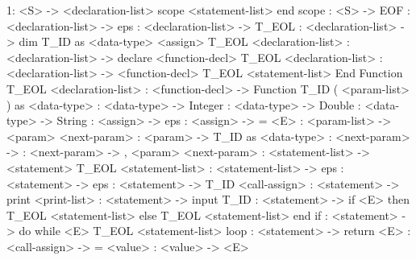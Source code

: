 \documentclass[11pt, titlepage, a4paper]{article}
\begin{document}
		1:  <S> -> <declaration-list> scope <statement-list> end scope :  <S> -> EOF :  <declaration-list> -> eps :  <declaration-list> -> T\_EOL  :  <declaration-list> -> dim T\_ID as <data-type> <assign> T\_EOL <declaration-list> :  <declaration-list> -> declare <function-decl> T\_EOL <declaration-list> :  <declaration-list> -> <function-decl> T\_EOL <statement-list> End Function T\_EOL <declaration-list> :  <function-decl> -> Function T\_ID ( <param-list> ) as <data-type> :  <data-type> -> Integer : <data-type> -> Double : <data-type> -> String : <assign> -> eps : <assign> -> = <E> : <param-list> -> <param> <next-param> : <param> -> T\_ID as <data-type> : <next-param> ->  : <next-param> -> , <param> <next-param> : <statement-list> -> <statement> T\_EOL <statement-list> : <statement-list> -> eps : <statement> -> eps : <statement> -> T\_ID <call-assign> : <statement> -> print <print-list> : <statement> -> input T\_ID : <statement> -> if <E> then T\_EOL <statement-list> else T\_EOL <statement-list> end if : <statement> -> do while <E> T\_EOL <statement-list> loop : <statement> -> return <E> : <call-assign> -> = <value> : <value> -> <E> \newline
\end{document}
